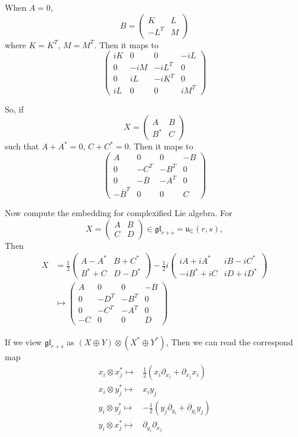 \documentclass[12pt]{amsart}
\def\bC{{\mathbb{C}}}
\def\agl{\mathfrak{gl}}
\def\fuu{\mathfrak{u}}
\begin{document}
When $A=0$,
\[
B =\begin{pmatrix}
K & L\\
-L^T & M  
\end{pmatrix}
\]
where $K = K^T$, $M=M^T$.
Then it maps to 
\[
\begin{pmatrix}
iK & 0 & 0 & -iL \\
0 & -iM & -iL^T & 0\\
0 & iL & -iK^T & 0\\
iL& 0 & 0 & iM^T
\end{pmatrix}
\]

So, if 
\[
X = \begin{pmatrix}
A & B\\
B^* & C
\end{pmatrix}
\] such that $A+A^*=0$, $C+C^*=0$.
Then it maps to 
\[
\begin{pmatrix}
A & 0 & 0 & -B\\
0 & -C^T & -B^T & 0\\
0 & -\overline{B} & -A^T & 0 \\
-\overline{B}^T & 0&  0& C  
\end{pmatrix}
\]

Now compute the embedding for complexified Lie algebra.
For 
\[X = 
\begin{pmatrix}
A & B\\
C & D
\end{pmatrix}
\in \agl_{r+s} = \fuu_\bC(r,s), 
\]
Then 
\[
\begin{split}
X &= \frac{1}{2}\begin{pmatrix}
A-A^* & B+C^*\\
B^*+C & D-D^*
\end{pmatrix}
- \frac{1}{2}i
\begin{pmatrix}
iA+iA^* & iB-iC^*\\
-iB^*+iC & iD+iD^*
\end{pmatrix}\\
&\mapsto
\begin{pmatrix}
A & 0 & 0 & -B \\
0 & -D^T & -B^T & 0\\
0 & -C^T & -A^T & 0 \\
-C& 0   & 0 & D
\end{pmatrix}
\end{split}
\]

If we view $\agl_{r+s}$ as $(X\oplus Y)\otimes (X^*\oplus Y^*)$, 
Then we can read the correspond map 
\begin{align*}
x_i\otimes x_j^* \mapsto&
 \frac{1}{2}(x_i \partial_{x_j} + \partial_{x_j} x_i)\\ 
x_i\otimes y_j^* \mapsto&
 x_iy_j\\ 
y_i\otimes y_j^* \mapsto&
- \frac{1}{2}(y_j \partial_{y_i} + \partial_{y_i} y_j)\\ 
y_i\otimes x_j^* \mapsto&
\partial_{y_i}\partial_{x_j}
\end{align*}
\end{document}
